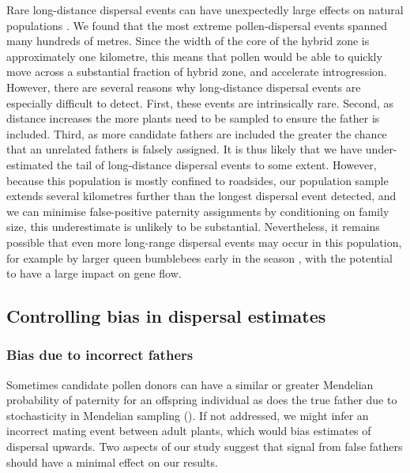 \documentclass[10pt, a4paper, twocolumn]{article} %
\begin{document}
Rare long-distance dispersal events can have unexpectedly large effects on natural populations \citep{clark1998trees}.
We found that the most extreme pollen-dispersal events spanned many hundreds of metres.
Since the width of the core of the hybrid zone is approximately one kilometre, this means that pollen would be able to quickly move across a substantial fraction of hybrid zone, and accelerate introgression.
However, there are several reasons why long-distance dispersal events are especially difficult to detect.
First, these events are intrinsically rare.
Second, as distance increases the more plants need to be sampled to ensure the father is included.
Third, as more candidate fathers are included the greater the chance that an unrelated fathers is falsely assigned.
It is thus likely that we have under-estimated the tail of long-distance dispersal events to some extent.
However, because this population is mostly confined to roadsides, our population sample extends several kilometres further than the longest dispersal event detected, and we can minimise false-positive paternity assignments by conditioning on family size, this underestimate is unlikely to be substantial.
Nevertheless, it remains possible that even more long-range dispersal events may occur in this population, for example by larger queen bumblebees early in the season \citep{lepais2010estimation}, with the potential to have a large impact on gene flow.

\subsection{Controlling bias in dispersal estimates}

\subsubsection{Bias due to incorrect fathers}

Sometimes candidate pollen donors can have a similar or greater Mendelian probability of paternity for an offspring individual as does the true father due to stochasticity in Mendelian sampling (\cite{thompson1976paradox}).
If not addressed, we might infer an incorrect mating event between adult plants, which would bias estimates of dispersal upwards.
Two aspects of our study suggest that signal from false fathers should have a minimal effect on our results.
\end{document}
